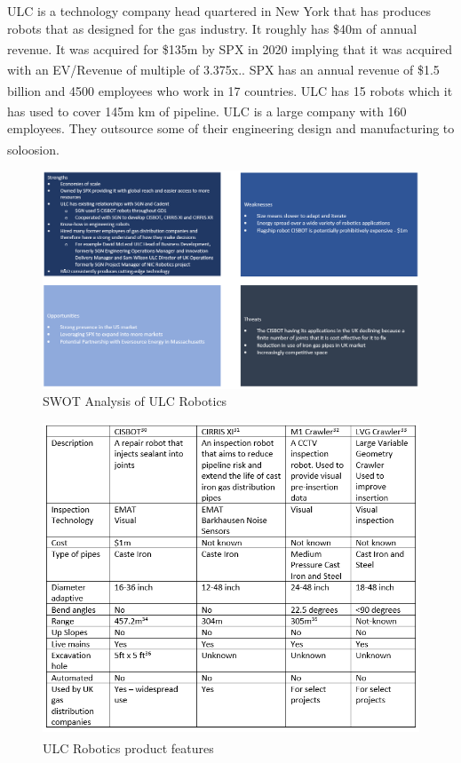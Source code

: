 \documentclass[11pt]{article}		%
\newcommand{\supercite}[1]{\textsuperscript{\cite{#1}}}		%
\begin{document}
	        ULC is a technology company head quartered in New York that has produces robots that as designed for the gas industry. It roughly has \$40m of annual revenue.\supercite{SPX_acquisition} It was acquired for \$135m by SPX in 2020 implying that it was acquired with an EV/Revenue of multiple of 3.375x.\supercite{SPX_multiple}.  SPX has an annual revenue of \$1.5 billion and 4500 employees who work in 17 countries.\supercite{SPX_acquisition} ULC has 15 robots which it has used to cover 145m km of pipeline.\supercite{ULC_news} ULC is a large company with 160 employees. They outsource some of their engineering design and manufacturing to soloosion.\supercite{soloosian}
	        

            \begin{figure}[h]
				\centering
				\includegraphics[scale=1]{SWOT of ULC.PNG}
				\caption{SWOT Analysis of ULC Robotics}
				\label{ULCSwot}
			\end{figure}
            
            \begin{figure}[h]
				\centering
				\includegraphics[scale=1]{ulc robots 2.PNG}
				\caption{ULC Robotics product features\supercite{ULC_Robots}}
				\label{ULCFeatures}
		\end{figure}
        
\end{document}
